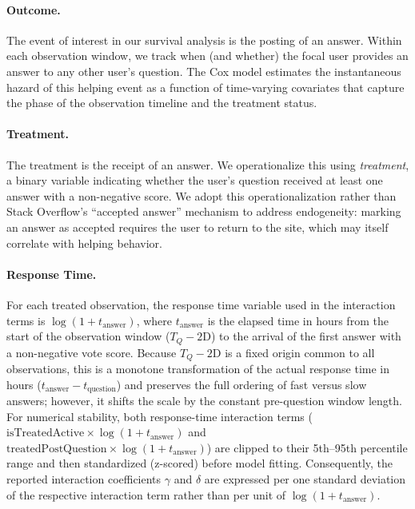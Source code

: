 \paragraph{Outcome.} The event of interest in our survival analysis is the posting of an answer. Within each observation window, we track when (and whether) the focal user provides an answer to any other user's question. The Cox model estimates the instantaneous hazard of this helping event as a function of time-varying covariates that capture the phase of the observation timeline and the treatment status.

\paragraph{Treatment.} The treatment is the receipt of an answer. We operationalize this using \textit{treatment}, a binary variable indicating whether the user's question received at least one answer with a non-negative score. We adopt this operationalization rather than Stack Overflow's ``accepted answer'' mechanism to address endogeneity: marking an answer as accepted requires the user to return to the site, which may itself correlate with helping behavior.

\paragraph{Response Time.} For each treated observation, the response time variable used in the interaction terms is $\log(1 + t_{\text{answer}})$, where $t_{\text{answer}}$ is the elapsed time in hours from the start of the observation window ($T_Q - 2\text{D}$) to the arrival of the first answer with a non-negative vote score. Because $T_Q - 2\text{D}$ is a fixed origin common to all observations, this is a monotone transformation of the actual response time in hours ($t_{\text{answer}} - t_{\text{question}}$) and preserves the full ordering of fast versus slow answers; however, it shifts the scale by the constant pre-question window length. For numerical stability, both response-time interaction terms ($\text{isTreatedActive} \times \log(1+t_{\text{answer}})$ and $\text{treatedPostQuestion} \times \log(1+t_{\text{answer}})$) are clipped to their 5th--95th percentile range and then standardized (z-scored) before model fitting. Consequently, the reported interaction coefficients $\gamma$ and $\delta$ are expressed per one standard deviation of the respective interaction term rather than per unit of $\log(1+t_{\text{answer}})$.

